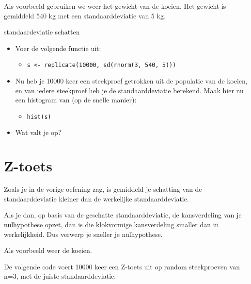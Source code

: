 \documentclass[]{book}
\providecommand{\tightlist}{%
  \setlength{\itemsep}{0pt}\setlength{\parskip}{0pt}}
\theoremstyle{definition}
\theoremstyle{definition}
\theoremstyle{definition}
\theoremstyle{remark}
\let\BeginKnitrBlock\begin \let\EndKnitrBlock\end
\begin{document}
Als voorbeeld gebruiken we weer het gewicht van de koeien. Het gewicht
is gemiddeld 540 kg met een standaarddeviatie van 5 kg.

\BeginKnitrBlock{exercise}
\protect\hypertarget{exr:stdev}{}{\label{exr:stdev} }standaardeviatie
schatten

\begin{itemize}
\tightlist
\item
  Voer de volgende functie uit:

  \begin{itemize}
  \tightlist
  \item
    \texttt{s\ \textless{}-\ replicate(10000,\ sd(rnorm(3,\ 540,\ 5)))}
  \end{itemize}
\item
  Nu heb je 10000 keer een steekproef getrokken uit de populatie van de
  koeien, en van iedere steekproef heb je de standaarddeviatie berekend.
  Maak hier nu een histogram van (op de snelle manier):

  \begin{itemize}
  \tightlist
  \item
    \texttt{hist(s)}
  \end{itemize}
\item
  Wat valt je op?
\end{itemize}
\EndKnitrBlock{exercise}

\section{Z-toets}\label{z-toets}

Zoals je in de vorige oefening zag, is gemiddeld je schatting van de
standaarddeviatie kleiner dan de werkelijke standaarddeviatie.

Als je dan, op basis van de geschatte standaarddeviatie, de
kansverdeling van je nulhypothese opzet, dan is die klokvormige
kansverdeling smaller dan in werkelijkheid. Dus verwerp je sneller je
nulhypothese.

Als voorbeeld weer de koeien.

De volgende code voert 10000 keer een Z-toets uit op random steekproeven
van n=3, met de juiste standaarddeviatie:
\end{document}
